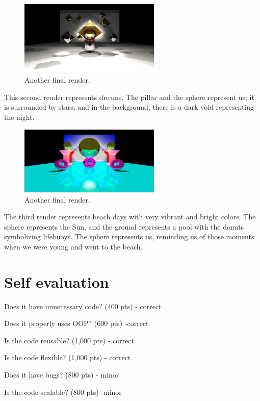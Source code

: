 \documentclass[12pt]{article}
\begin{document}
\begin{figure}[h]
	\centering
	\includegraphics[width=0.6\textwidth]{FINAL2.png}
	\caption{Another final render.}
	\label{fig:image7}
\end{figure}

	This second render represents dreams. The pillar and the sphere represent us; it is surrounded by stars, and in the background, there is a dark void representing the night.\\
	
	\begin{figure}[h]
	\centering
	\includegraphics[width=0.6\textwidth]{FINAL3.png}
	\caption{Another final render.}
	\label{fig:image7}
	\end{figure}
	
The third render represents beach days with very vibrant and bright colors. The sphere represents the Sun, and the ground represents a pool with the donuts symbolizing lifebuoys. The sphere represents us, reminding us of those moments when we were young and went to the beach.
	\section{Self evaluation}
	Does it have unnecessary code? (400 pts) - correct
	
	Does it properly uses OOP? (600 pts) -correct
	
	Is the code reusable? (1,000 pts) - correct
	
	Is the code flexible? (1,000 pts) - correct
	
	Does it have bugs? (800 pts) - minor
	
	Is the code scalable? (800 pts) -minor
	
\end{document}
